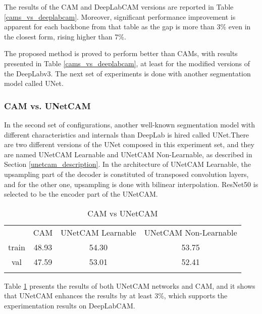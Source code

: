\documentclass[sn-mathphys]{sn-jnl}
\theoremstyle{thmstyleone}
\theoremstyle{thmstyletwo}\newtheorem{example}{Example}\newtheorem{remark}{Remark}
\theoremstyle{thmstylethree}\newtheorem{definition}{Definition}
\begin{document}
The results of the CAM and DeepLabCAM versions are reported in Table \ref{cams_vs_deeplabcam}. Moreover, significant performance improvement is apparent for each backbone from that table as the gap is more than 3\% even in the closest form, rising higher than 7\%.  

The proposed method is proved to perform better than CAMs, with results presented in Table \ref{cams_vs_deeplabcam}, at least for the modified versions of the DeepLabv3. The next set of experiments is done with another segmentation model called UNet.

\subsubsection{CAM vs. UNetCAM}

In the second set of configurations, another well-known segmentation model with different characteristics and internals than DeepLab is hired called UNet.There are two different versions of the UNet composed in this experiment set, and they are named UNetCAM Learnable and UNetCAM Non-Learnable, as described in Section \ref{unetcam_description}. In the architecture of UNetCAM Learnable, the upsampling part of the decoder is constituted of transposed convolution layers, and for the other one, upsampling is done with bilinear interpolation. ResNet50 is selected to be the encoder part of the UNetCAM.


\begin{table}[!ht]
    \begin{center}
        \begin{minipage}{\textwidth}
            \caption{CAM vs UNetCAM}\label{cam_vs_unetcam_trainaug}\begin{tabular*}{\textwidth}{@{\extracolsep{\fill}}cccc@{\extracolsep{\fill}}}
            \toprule & CAM & UNetCAM Learnable & UNetCAM Non-Learnable \\
            \cmidrule{1-4}train & 48.93 & 54.30 & 53.75 \\
            val & 47.59 & 53.01 & 52.41 \\
            \botrule
            \end{tabular*}
        \end{minipage}
    \end{center}
\end{table}


Table \ref{cam_vs_unetcam_trainaug} presents the results of both UNetCAM networks and CAM, and it shows that UNetCAM enhances the results by at least 3\%, which supports the experimentation results on DeepLabCAM.
\end{document}
